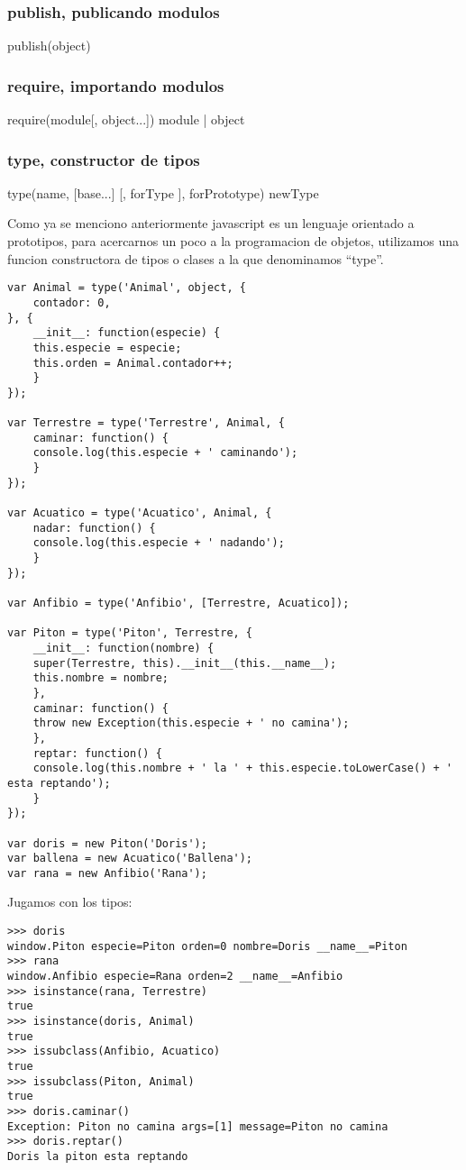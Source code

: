 \subsubsection*{publish, publicando modulos}
publish(object)
\subsubsection*{require, importando modulos}
require(module[, object...]) \rightarrow module | object
\subsubsection*{type, constructor de tipos}
type(name, [base...] [, forType ], forPrototype) \rightarrow newType

Como ya se menciono anteriormente javascript es un lenguaje orientado a prototipos, para acercarnos un poco a la programacion
de objetos, utilizamos una funcion constructora de tipos o clases a la que denominamos “type”.
\begin{lstlisting}[style=javascript,label=definicion-de-tipos,caption=Definicion de tipos]
var Animal = type('Animal', object, {
    contador: 0,
}, {
    __init__: function(especie) {
	this.especie = especie;
	this.orden = Animal.contador++;
    }
});

var Terrestre = type('Terrestre', Animal, {
    caminar: function() {
	console.log(this.especie + ' caminando');
    }
});

var Acuatico = type('Acuatico', Animal, {
    nadar: function() {
	console.log(this.especie + ' nadando');
    }
});

var Anfibio = type('Anfibio', [Terrestre, Acuatico]);

var Piton = type('Piton', Terrestre, {
    __init__: function(nombre) {
	super(Terrestre, this).__init__(this.__name__);
	this.nombre = nombre;
    },
    caminar: function() {
	throw new Exception(this.especie + ' no camina');
    },
    reptar: function() {
	console.log(this.nombre + ' la ' + this.especie.toLowerCase() + ' esta reptando');
    }
});

var doris = new Piton('Doris');
var ballena = new Acuatico('Ballena');
var rana = new Anfibio('Rana');
\end{lstlisting}

\noindent
Jugamos con los tipos:
\begin{lstlisting}[style=consola]
>>> doris
window.Piton especie=Piton orden=0 nombre=Doris __name__=Piton
>>> rana
window.Anfibio especie=Rana orden=2 __name__=Anfibio
>>> isinstance(rana, Terrestre)
true
>>> isinstance(doris, Animal)
true
>>> issubclass(Anfibio, Acuatico)
true
>>> issubclass(Piton, Animal)
true
>>> doris.caminar()
Exception: Piton no camina args=[1] message=Piton no camina
>>> doris.reptar()
Doris la piton esta reptando
\end{lstlisting}


